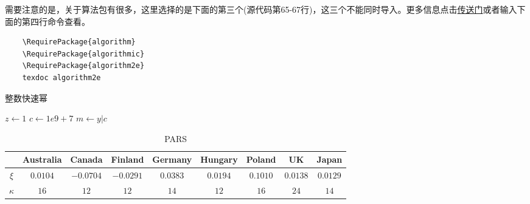 需要注意的是，关于算法包有很多，这里选择的是下面的第三个(源代码第65-67行)，这三个不能同时导入。更多信息点击\href{https://www.overleaf.com/learn/latex/Algorithms}{传送门}或者输入下面的第四行命令查看。
\begin{tcolorbox}[colback=gray!10,
    colframe=black,
    width=16cm,
    arc=1mm, auto outer arc,
    boxrule=0.5pt,]
\begin{verbatim}
    \RequirePackage{algorithm}
    \RequirePackage{algorithmic}
    \RequirePackage{algorithm2e} 
    texdoc algorithm2e 
\end{verbatim}
\end{tcolorbox}

\begin{algorithm}[H]
    \SetAlgoLined
    \caption{整数快速幂}
    $z \gets 1$ \;
    $c \gets 1e9+7$\;
    $m \gets y | c$\;
\end{algorithm}

\begin{table}[H]
	\centering
	\caption{PARS}
	\label{tab:bestpar}
			\begin{tabular}{ccccccccc}
				\toprule
				& Australia & Canada  & Finland & Germany & Hungary & Poland & UK     & Japan  \\ \midrule
				$\xi$  & $0.0104$    & $-0.0704$ & $-0.0291$ & $0.0383$  & $0.0194$  & $0.1010$  & $0.0138$ & $0.0129$ \\
				$\kappa$ & $16$        & $12$      & $12$      & $14$      & $12$      & $16$     & $24$     & $14$     \\ \bottomrule
			\end{tabular}%
\end{table}


